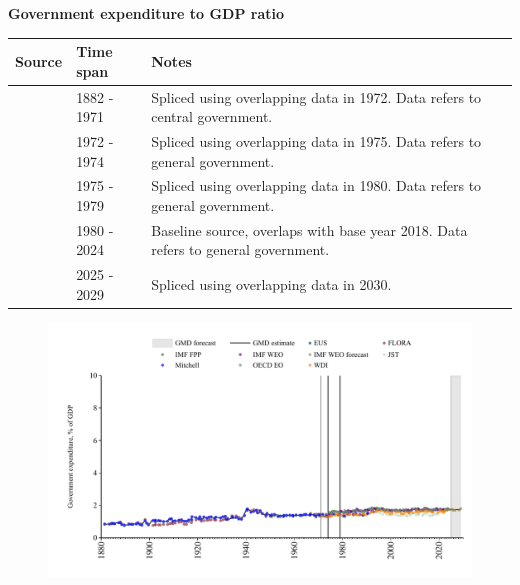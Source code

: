\documentclass[12pt,a4paper,landscape]{article}
\begin{document}
\begin{adjustbox}{max totalsize={\paperwidth}{\paperheight},center}
\begin{minipage}[t][\textheight][t]{\textwidth}
\vspace*{0.5cm}
{}
\begin{center}
{\Large\bfseries Government expenditure to GDP ratio}
\end{center}
\vspace{0.5cm}
\begin{table}[H]
\centering
\small
\begin{tabular}{|l|l|l|}
\hline
\textbf{Source} & \textbf{Time span} & \textbf{Notes} \\
\hline
\rowcolor{white}\cite{JST}& 1882 - 1971 &Spliced using overlapping data in 1972. Data refers to central government.\\
\rowcolor{lightgray}\cite{WDI}& 1972 - 1974 &Spliced using overlapping data in 1975. Data refers to general government.\\
\rowcolor{white}\cite{OECD_EO}& 1975 - 1979 &Spliced using overlapping data in 1980. Data refers to general government.\\
\rowcolor{lightgray}\cite{EUS}& 1980 - 2024 &Baseline source, overlaps with base year 2018. Data refers to general government.\\
\rowcolor{white}\cite{IMF_WEO_forecast}& 2025 - 2029 &Spliced using overlapping data in 2030. \\
\hline
\end{tabular}
\end{table}
\begin{figure}[H]
\centering
\includegraphics[width=\textwidth,height=0.6\textheight,keepaspectratio]{graphs/FIN_govexp_GDP.pdf}
\end{figure}
\end{minipage}
\end{adjustbox}
\end{document}
